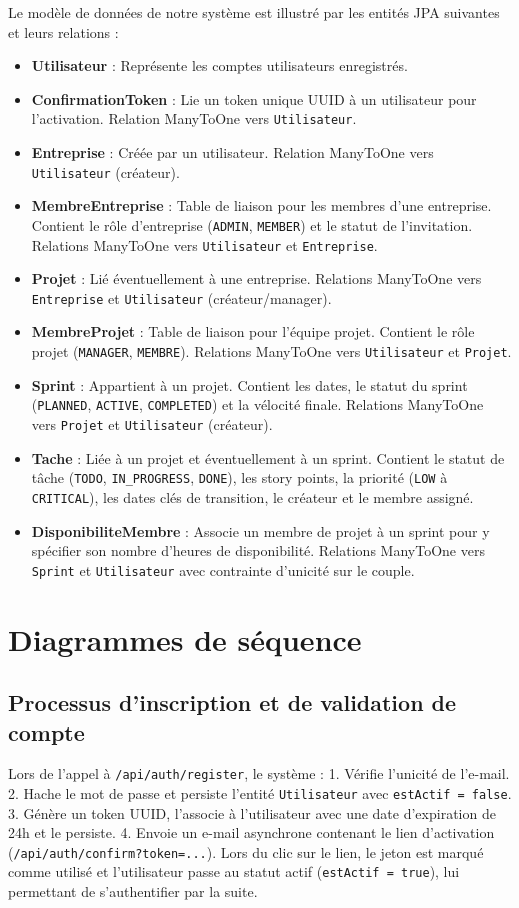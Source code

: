 \documentclass[12pt,a4paper]{report}
\begin{document}
Le modèle de données de notre système est illustré par les entités JPA suivantes et leurs relations :
\begin{itemize}
\item \textbf{Utilisateur} : Représente les comptes utilisateurs enregistrés.
\item \textbf{ConfirmationToken} : Lie un token unique UUID à un utilisateur pour l'activation. Relation ManyToOne vers \verb|Utilisateur|.
\item \textbf{Entreprise} : Créée par un utilisateur. Relation ManyToOne vers \verb|Utilisateur| (créateur).
\item \textbf{MembreEntreprise} : Table de liaison pour les membres d'une entreprise. Contient le rôle d'entreprise (\verb|ADMIN|, \verb|MEMBER|) et le statut de l'invitation. Relations ManyToOne vers \verb|Utilisateur| et \verb|Entreprise|.
\item \textbf{Projet} : Lié éventuellement à une entreprise. Relations ManyToOne vers \verb|Entreprise| et \verb|Utilisateur| (créateur/manager).
\item \textbf{MembreProjet} : Table de liaison pour l'équipe projet. Contient le rôle projet (\verb|MANAGER|, \verb|MEMBRE|). Relations ManyToOne vers \verb|Utilisateur| et \verb|Projet|.
\item \textbf{Sprint} : Appartient à un projet. Contient les dates, le statut du sprint (\verb|PLANNED|, \verb|ACTIVE|, \verb|COMPLETED|) et la vélocité finale. Relations ManyToOne vers \verb|Projet| et \verb|Utilisateur| (créateur).
\item \textbf{Tache} : Liée à un projet et éventuellement à un sprint. Contient le statut de tâche (\verb|TODO|, \verb|IN_PROGRESS|, \verb|DONE|), les story points, la priorité (\verb|LOW| à \verb|CRITICAL|), les dates clés de transition, le créateur et le membre assigné.
\item \textbf{DisponibiliteMembre} : Associe un membre de projet à un sprint pour y spécifier son nombre d'heures de disponibilité. Relations ManyToOne vers \verb|Sprint| et \verb|Utilisateur| avec contrainte d'unicité sur le couple.
\end{itemize}

\section{Diagrammes de séquence}

\subsection{Processus d'inscription et de validation de compte}
Lors de l'appel à \verb|/api/auth/register|, le système :
1. Vérifie l'unicité de l'e-mail.
2. Hache le mot de passe et persiste l'entité \verb|Utilisateur| avec \verb|estActif = false|.
3. Génère un token UUID, l'associe à l'utilisateur avec une date d'expiration de 24h et le persiste.
4. Envoie un e-mail asynchrone contenant le lien d'activation (\verb|/api/auth/confirm?token=...|).
Lors du clic sur le lien, le jeton est marqué comme utilisé et l'utilisateur passe au statut actif (\verb|estActif = true|), lui permettant de s'authentifier par la suite.
\end{document}
